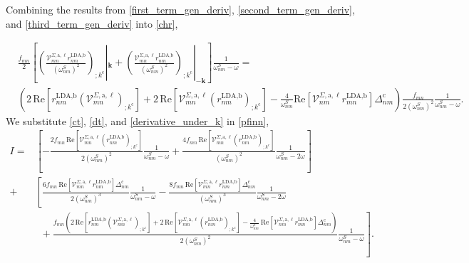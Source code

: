 Combining the results from \eqref{first_term_gen_deriv}, \eqref{second_term_gen_deriv}, and \eqref{third_term_gen_deriv} into \eqref{chr},

\begin{align}\label{derivative_under_k}
&\frac{f_{mn}}{2}\left[\left(\frac{\mathcal{V}^{\Sigma,\text{a},\ell}_{mn}r^{\text{LDA,b}}_{nm}}{(\omega^S_{nm})^2}\right)_{;k^{\text{c}}}|_{\mathbf{k}} + \left(\frac{\mathcal{V}^{\Sigma,\text{a},\ell}_{mn}r^{\text{LDA,b}}_{nm}}{(\omega^S_{nm})^2}\right)_{;k^{\text{c}}}|_{-\mathbf{k}}\right]\frac{1}{\omega^S_{nm}-\omega} = \nonumber\\
&\left(2\,\mathrm{Re}\left[r^{\text{LDA,b}}_{nm}\left(\mathcal{V}^{\Sigma,\text{a},\ell}_{mn}\right)_{;k^{\text{c}}}\right] + 2\,\mathrm{Re}\left[\mathcal{V}^{\Sigma,\text{a},\ell}_{mn}\left(r^{\text{LDA,b}}_{nm}\right)_{;k^{\text{c}}}\right] - \frac{4}{\omega^{S}_{nm}}\mathrm{Re}\left[\mathcal{V}^{\Sigma,\text{a},\ell}_{nm}r^{\text{LDA,b}}_{mn}\right]\Delta_{nm}^{\text{c}}\right)\frac{f_{mn}}{2(\omega^{S}_{nm})^{2}}\frac{1}{\omega^S_{nm}-\omega}.
\end{align}
We substitute \eqref{ct}, \eqref{dt}, and \eqref{derivative_under_k} in \eqref{pfinn},
\begin{align*}
I
= &\left[-\frac{2f_{mn}\,\mathrm{Re}\left[\mathcal{V}^{\Sigma,\text{a},\ell}_{mn}\left(r^{\text{LDA,b}}_{nm}\right)_{;k^{\text{c}}}\right]}{2(\omega^{S}_{nm})^{2}}\frac{1}{\omega^{S}_{nm}-\omega} + \frac{4f_{mn}\,\mathrm{Re}\left[\mathcal{V}^{\Sigma,\text{a},\ell}_{mn}\left(r^{\text{LDA,b}}_{nm}\right)_{;k^{\text{c}}}\right]}{(\omega^{S}_{nm})^{2}}\frac{1}{\omega^{S}_{nm}-2\omega}\right]\nonumber\\
+ &\left[\frac{6f_{mn}\,\mathrm{Re}\left[\mathcal{V}^{\Sigma,\text{a},\ell}_{mn}r^{\text{LDA,b}}_{nm}\right]\Delta^{\text{c}}_{nm}}{2(\omega^{S}_{nm})^{3}}\frac{1}{\omega^{S}_{nm}-\omega} 
- \frac{8f_{mn}\,\mathrm{Re}\left[\mathcal{V}^{\Sigma,\text{a},\ell}_{mn}r^{\text{LDA,b}}_{nm}\right]\Delta^{\text{c}}_{nm}}{(\omega^{S}_{nm})^{3}}\frac{1}{\omega^{S}_{nm}-2\omega}\right.\nonumber\\
&\,\,\,+ \left.\frac{f_{mn}\left(2\,\mathrm{Re}\left[r^{\text{LDA,b}}_{nm}\left(\mathcal{V}^{\Sigma,\text{a},\ell}_{mn}\right)_{;k^{\text{c}}}\right] + 2\,\mathrm{Re}\left[\mathcal{V}^{\Sigma,\text{a},\ell}_{mn}\left(r^{\text{LDA,b}}_{nm}\right)_{;k^{\text{c}}}\right] - \frac{4}{\omega^{S}_{nm}}\,\mathrm{Re}\left[\mathcal{V}^{\Sigma,\text{a},\ell}_{nm}r^{\text{LDA,b}}_{mn}\right]\Delta_{nm}^{\text{c}}\right)}{2(\omega^{S}_{nm})^{2}}\frac{1}{\omega^S_{nm}-\omega}\right].
\end{align*}


